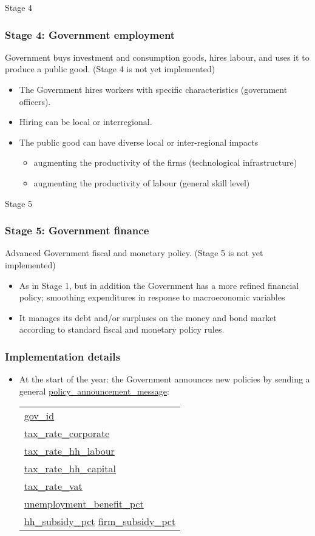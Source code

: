 \documentclass{beamer}
\begin{document}
\begin{frame}{Stage 4}
\frametitle{Stage 4: Government employment}
Government buys investment and consumption goods, hires labour, and uses it to produce a public good.
(Stage 4 is not yet implemented)

\begin{itemize}
\item The Government hires workers with specific characteristics (government officers).
\item Hiring can be local or interregional.
\item The public good can have diverse local or inter-regional impacts
	\begin{itemize}
	\item augmenting the productivity of the firms (technological infrastructure)
	\item augmenting the productivity of labour (general skill level)
	\end{itemize}
\end{itemize}
\end{frame}

\begin{frame}{Stage 5}
\frametitle{Stage 5: Government finance}
Advanced Government fiscal and monetary policy.
(Stage 5 is not yet implemented)
\begin{itemize}
\item As in Stage 1, but in addition the Government has a more refined financial policy; smoothing expenditures in response to macroeconomic variables
\item It manages its debt and/or surpluses on the money and bond market according
to standard fiscal and monetary  policy rules.
\end{itemize}
\end{frame}

\begin{frame}{}
\frametitle{Implementation details}
\begin{itemize}
\item At the start of the year: the Government announces new policies by
sending a general \url{policy_announcement_message}:
\begin{tabular}{l}
\url{gov_id}\\
\url{tax_rate_corporate}\\
\url{tax_rate_hh_labour}\\
\url{tax_rate_hh_capital}\\
\url{tax_rate_vat}\\
\url{unemployment_benefit_pct}\\
\url{hh_subsidy_pct}
\url{firm_subsidy_pct}
\end{tabular}
\end{itemize}
\end{frame}
\end{document}

